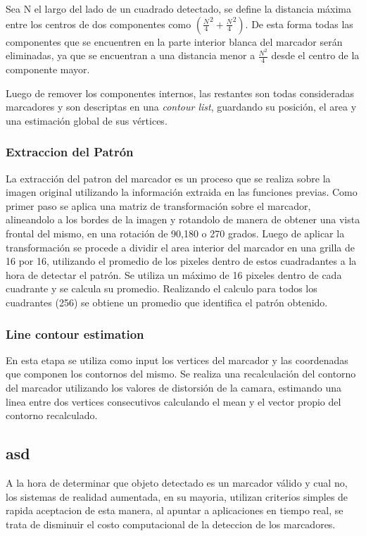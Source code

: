 \documentclass[runningheads]{llncs}
\begin{document}
Sea N el largo del lado de un cuadrado detectado, se define la distancia máxima entre los centros de dos componentes como $ (\frac{N}{4}^2 + \frac{N}{4}^2)$. De esta forma todas las componentes que se encuentren en la parte interior blanca del marcador serán eliminadas, ya que se encuentran a una distancia menor a $\frac{N^2}{4}$ desde el centro de la componente mayor.

Luego de remover los componentes internos, las restantes son todas consideradas marcadores y son descriptas en una \textit{contour list}, guardando su posición, el area y una estimación global de sus vértices.
	
\subsubsection{Extraccion del Patrón}
La extracción del patron del marcador es un proceso que se realiza sobre la imagen original utilizando la información extraida en las funciones previas. Como primer paso se aplica una matriz de transformación sobre el marcador, alineandolo a los bordes de la imagen y rotandolo de manera de obtener una vista frontal del mismo, en una rotación de 90,180 o 270 grados. Luego de aplicar la transformación se procede a 
dividir el area interior del marcador en una grilla de 16 por 16, utilizando el promedio de los pixeles dentro de estos cuadradantes a la hora de detectar el patrón. Se utiliza un máximo de 16 pixeles dentro de cada cuadrante y se calcula su promedio. Realizando el calculo para todos los cuadrantes (256) se obtiene un promedio que identifica el patrón obtenido.


\subsubsection{Line contour estimation}

En esta etapa se utiliza como input los vertices del marcador y las coordenadas que componen los contornos del mismo. Se realiza una recalculación del contorno del marcador utilizando los valores de distorsión de la camara, estimando una linea entre dos vertices consecutivos calculando el mean y el vector propio del contorno recalculado.
	
	\subsection{asd}
	A la hora de determinar que objeto detectado es un marcador válido y cual no, los sistemas de realidad aumentada, en su mayoria, utilizan criterios simples de rapida aceptacion de esta manera, al apuntar a aplicaciones en tiempo real, se trata de disminuir el costo computacional de la deteccion de los marcadores.
	
\end{document}
